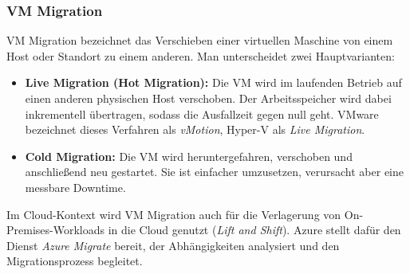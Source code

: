\subsubsection{VM Migration}
VM Migration bezeichnet das Verschieben einer virtuellen Maschine von einem
Host oder Standort zu einem anderen. Man unterscheidet zwei Hauptvarianten:

\begin{itemize}
    \item \textbf{Live Migration (Hot Migration):} Die VM wird im
    laufenden Betrieb auf einen anderen physischen Host verschoben. Der
    Arbeitsspeicher wird dabei inkrementell übertragen, sodass die Ausfallzeit
    gegen null geht. VMware bezeichnet dieses Verfahren als \textit{vMotion},
    Hyper-V als \textit{Live Migration}.

    \item \textbf{Cold Migration:} Die VM wird heruntergefahren,
    verschoben und anschließend neu gestartet. Sie ist einfacher umzusetzen,
    verursacht aber eine messbare Downtime.
\end{itemize}

Im Cloud-Kontext wird VM Migration auch für die Verlagerung von
On-Premises-Workloads in die Cloud genutzt (\textit{Lift and Shift}).
Azure stellt dafür den Dienst \textit{Azure Migrate} bereit, der Abhängigkeiten
analysiert und den Migrationsprozess begleitet.